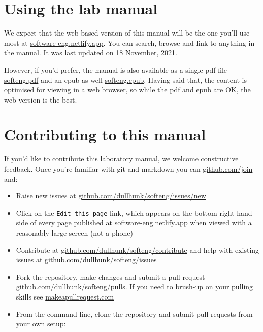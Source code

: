 \documentclass[
]{book}
\providecommand{\tightlist}{%
  \setlength{\itemsep}{0pt}\setlength{\parskip}{0pt}}
\begin{document}
\hypertarget{usingit}{%
\section{Using the lab manual}\label{usingit}}

We expect that the web-based version of this manual will be the one you'll use most at \href{https://software-eng.netlify.app/}{software-eng.netlify.app}. You can search, browse and link to anything in the manual. It was last updated on 18 November, 2021.

However, if you'd prefer, the manual is also available as a single pdf file \href{https://software-eng.netlify.app/softeng.pdf}{softeng.pdf} and an epub as well \href{https://software-eng.netlify.app/softeng.epub}{softeng.epub}. Having said that, the content is optimised for viewing in a web browser, so while the pdf and epub are OK, the web version is the best.

\hypertarget{contributing}{%
\section{Contributing to this manual}\label{contributing}}

If you'd like to contribute this laboratory manual, we welcome constructive feedback. Once you're familiar with git and markdown you can \href{https://github.com/join}{github.com/join} and:

\begin{itemize}
\tightlist
\item
  Raise new issues at \href{https://github.com/dullhunk/softeng/issues/new}{github.com/dullhunk/softeng/issues/new}
\item
  Click on the \texttt{Edit\ this\ page} link, which appears on the bottom right hand side of every page published at \href{https://software-eng.netlify.app}{software-eng.netlify.app} when viewed with a reasonably large screen (not a phone)
\item
  Contribute at \href{https://github.com/dullhunk/softeng/contribute}{github.com/dullhunk/softeng/contribute} and help with existing issues at \href{https://github.com/dullhunk/softeng/issues}{github.com/dullhunk/softeng/issues}
\item
  Fork the repository, make changes and submit a pull request \href{https://github.com/dullhunk/softeng/pulls}{github.com/dullhunk/softeng/pulls}. If you need to brush-up on your pulling skills see \href{http://makeapullrequest.com/}{makeapullrequest.com}
\item
  From the command line, clone the repository and submit pull requests from your own setup:
\end{itemize}
\end{document}
